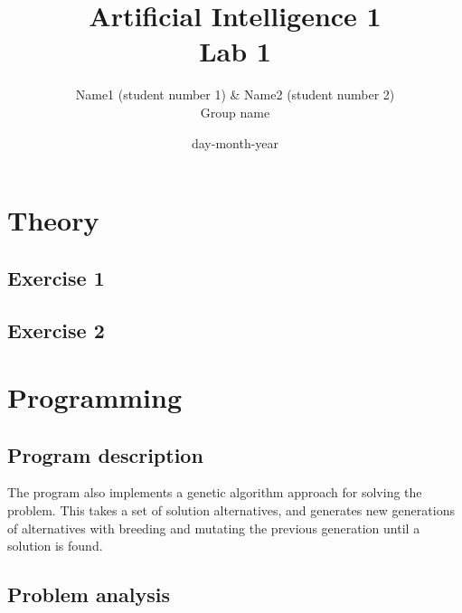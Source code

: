 \documentclass{article}
\title{Artificial Intelligence 1 \\ Lab 1}%
\author{Name1 (student number 1) \& Name2 (student number 2) \\ Group name} %
\date{day-month-year}%
\begin{document}
\maketitle

\section*{Theory}
\subsection*{Exercise 1}

\subsection*{Exercise 2}


\section*{Programming} 
\subsection*{Program description}
The program also implements a genetic algorithm approach for solving the problem. This takes a set of solution alternatives, and generates new generations of alternatives with breeding and mutating the previous generation until a solution is found.
\subsection*{Problem analysis}
\end{document}
